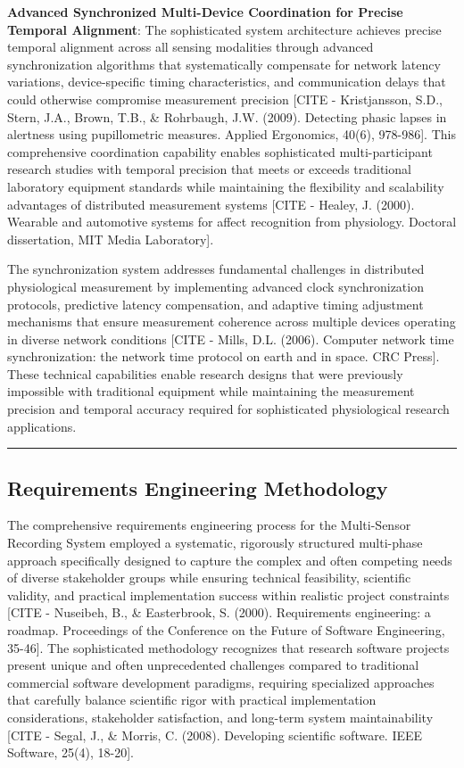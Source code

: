 \documentclass[12pt,a4paper]{report}
\begin{document}
\textbf{Advanced Synchronized Multi-Device Coordination for Precise Temporal Alignment}: The sophisticated system
architecture achieves precise temporal alignment across all sensing modalities through advanced synchronization
algorithms that systematically compensate for network latency variations, device-specific timing characteristics, and
communication delays that could otherwise compromise measurement
precision [CITE - Kristjansson, S.D., Stern, J.A., Brown, T.B., \& Rohrbaugh, J.W. (2009). Detecting phasic lapses in alertness using pupillometric measures. Applied Ergonomics, 40(6), 978-986].
This comprehensive coordination capability enables sophisticated multi-participant research studies with temporal
precision that meets or exceeds traditional laboratory equipment standards while maintaining the flexibility and
scalability advantages of distributed measurement
systems [CITE - Healey, J. (2000). Wearable and automotive systems for affect recognition from physiology. Doctoral dissertation, MIT Media Laboratory].

The synchronization system addresses fundamental challenges in distributed physiological measurement by implementing
advanced clock synchronization protocols, predictive latency compensation, and adaptive timing adjustment mechanisms
that ensure measurement coherence across multiple devices operating in diverse network
conditions [CITE - Mills, D.L. (2006). Computer network time synchronization: the network time protocol on earth and in space. CRC Press].
These technical capabilities enable research designs that were previously impossible with traditional equipment while
maintaining the measurement precision and temporal accuracy required for sophisticated physiological research
applications.

\hrule

\subsection{Requirements Engineering Methodology}

The comprehensive requirements engineering process for the Multi-Sensor Recording System employed a systematic,
rigorously structured multi-phase approach specifically designed to capture the complex and often competing needs of
diverse stakeholder groups while ensuring technical feasibility, scientific validity, and practical implementation
success within realistic project
constraints [CITE - Nuseibeh, B., \& Easterbrook, S. (2000). Requirements engineering: a roadmap. Proceedings of the Conference on the Future of Software Engineering, 35-46].
The sophisticated methodology recognizes that research software projects present unique and often unprecedented
challenges compared to traditional commercial software development paradigms, requiring specialized approaches that
carefully balance scientific rigor with practical implementation considerations, stakeholder satisfaction, and long-term
system
maintainability [CITE - Segal, J., \& Morris, C. (2008). Developing scientific software. IEEE Software, 25(4), 18-20].
\end{document}
